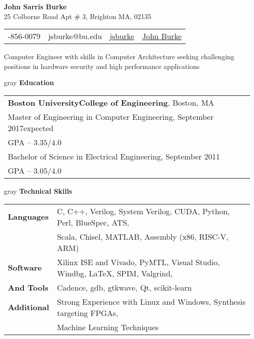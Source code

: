 \documentclass[10.5pt,letterpaper]{article}
\makeatletter
\newcommand{\org}[1]{\textbf{#1}}
\newcommand{\vertspace}{\vspace{1.2mm}}
\newcommand{\horzindent}{\hspace{3mm}}
\newcommand{\latex}{\LaTeX\space}
\newcommand{\tablewidth}{.9\linewidth}
\newcommand{\name}{John Sarris Burke}
\newcommand{\infoshift}{\hspace{15.5mm}}
\newcommand{\address}{25 Colborne Road Apt \# 3, Brighton MA, 02135 }
\newcommand{\phone}{781-856-0079}
\newcommand{\email}{jsburke@bu.edu}
\newcommand{\github}{\href{https://github.com/jsburke/}{jsburke}}
\newcommand{\linkedin}{\href{https://www.linkedin.com/in/john-burke-51325935/}{John Burke}}
\newcommand{\undergradmajor}{Electrical Engineering}
\newcommand{\undergradend}{September 2011}
\newcommand{\grad}{Boston University}
\newcommand{\gradschool}{College of Engineering}
\newcommand{\gradmajor}{Computer Engineering}
\newcommand{\gradend}{September 2017}
\newcommand{\objective}{Computer Engineer with skills in Computer Architecture seeking challenging positions in hardware security and high performance applications}
\newlength\myheight
\newlength\mydepth
\newcommand*\inlineicon[1]{%
  \settototalheight\myheight{Xygp}%
  \settodepth\mydepth{Xygp}%
  \raisebox{-\mydepth}{\texttt{[image: \#1]}}%
}
\newcommand{\iconemail}{\inlineicon{images/email-icon-2048}\space}
\newcommand{\icongithub}{\inlineicon{images/GitHub-Mark-120px-plus}\space}
\newcommand{\iconphone}{\inlineicon{images/phone-icon-black}\space}
\newcommand{\iconlinkedin}{\inlineicon{images/linkedin-icon-black}\space}
\makeatother
\begin{document}
	
	\begin{center}	
		\textbf{\large \name}\\
		\address\\
		\begin{tabular}{c||c||c||c}
			\infoshift \iconphone \phone & \iconemail \email & \icongithub \github & \iconlinkedin \linkedin \\
		\end{tabular}
		\newline \objective
	\end{center}

	\noindent
	\begin{heading}{gray}
		\textbf{Education}
	\end{heading}
		\begin{tabular*}{\tablewidth}{l}
			\org{\grad\space\gradschool}, Boston, MA \\
			\horzindent Master of Engineering in \gradmajor , \gradend\space expected \\
			\horzindent GPA -- $3.35 / 4.0$ \\
			\horzindent Bachelor of Science in \undergradmajor , \undergradend \\
			\horzindent GPA -- $3.05 / 4.0$ \\
		\end{tabular*}

	\noindent
	\begin{heading}{gray}
		\textbf{Technical Skills}
	\end{heading}
	\begin{tabular*}{\tablewidth}{l|l}
		\textbf{Languages} & C, C++, Verilog, System Verilog, CUDA, Python, Perl, BlueSpec, ATS,  \\
		  & Scala, Chisel, MATLAB, Assembly (x86, RISC-V, ARM) \\ \hline %
		\textbf{Software} & Xilinx ISE and Vivado, PyMTL, Visual Studio, Windbg, \latex, SPIM, Valgrind, \\
		  \textbf{And Tools}& Cadence, gdb, gtkwave, Qt, scikit-learn\\ \hline
		\textbf{Additional} & Strong Experience with Linux and Windows, Synthesis targeting FPGAs, \\
		& Machine Learning Techniques
	\end{tabular*}

	\iffalse
	
\end{document}
